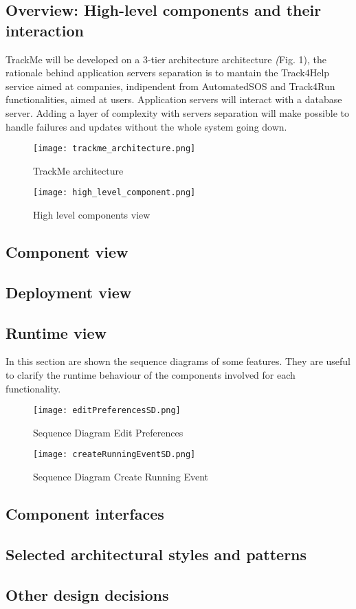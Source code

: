 \documentclass[../main.tex]{subfiles}
\begin{document}
\subsection{Overview: High-level components and their interaction}
 TrackMe will be developed on a 3-tier architecture architecture \textit(Fig. 1), the rationale behind application servers separation is to mantain the Track4Help service
 aimed at companies, indipendent from AutomatedSOS and Track4Run functionalities, aimed at users. Application servers will interact with a database server.  Adding a layer of complexity with servers separation will  make 
 possible to handle failures and updates without the whole system going down.


  \begin{figure}[ht]
    \centering
         \texttt{[image: trackme\_architecture.png]}
          \caption{TrackMe architecture}
           \label{fig:trackme_architecture}
    \end{figure}

    \begin{figure}[ht]
        \centering
             \texttt{[image: high\_level\_component.png]}
              \caption{High level components view}
               \label{fig:high_level_components}
        \end{figure}
 
\subsection{Component view}

\subsection{Deployment view}

\subsection{Runtime view}
In this section are shown the sequence diagrams of some features. They are useful to clarify the runtime behaviour of the components involved for each functionality.
\begin{figure}[h]
        \centering
             \texttt{[image: editPreferencesSD.png]}
              \caption{Sequence Diagram Edit Preferences }
               \label{fig:editPreferencesSD}
\end{figure}

\begin{figure}[h]
        \centering
             \texttt{[image: createRunningEventSD.png]}
              \caption{Sequence Diagram Create Running Event }
               \label{fig:createRunningEventSD}
\end{figure}


\subsection{Component interfaces}

\subsection{Selected architectural styles and patterns}

\subsection{Other design decisions}
\end{document}
